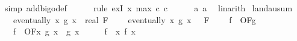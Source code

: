 \begin{isabellebody}
\ {\isacharparenleft}{\kern0pt}simp\ add{\isacharcolon}{\kern0pt}bigo{\isacharunderscore}{\kern0pt}def{\isacharparenright}{\kern0pt}\isanewline
\ \ \ \ \isamarkupfalse%
\ {\isacharparenleft}{\kern0pt}rule\ exI{\isacharbrackleft}{\kern0pt}\ x{\isacharequal}{\kern0pt}\ {\isachardoublequoteopen}max\ c{}\ c{}{\isachardoublequoteclose}{\isacharbrackright}{\kern0pt}{\isacharparenright}{\kern0pt}\isanewline
\ \ \ \ \isamarkupfalse%
\ a{}\ a{}\ \isamarkupfalse%
\ linarith\isanewline
{}\isamarkupfalse%
%
\endisatagproof
{\isafoldproof}%
%
\isadelimproof
\isanewline
%
\endisadelimproof
\isanewline
{}\isamarkupfalse%
\ landau{\isacharunderscore}{\kern0pt}sum{\isacharunderscore}{\kern0pt}{}{\isacharcolon}{\kern0pt}\isanewline
\ \ \ {\isachardoublequoteopen}eventually\ {\isacharparenleft}{\kern0pt}{\isasymlambda}x{\isachardot}{\kern0pt}\ g{}\ x\ {\isasymge}\ {\isacharparenleft}{\kern0pt}{}{\isacharcolon}{\kern0pt}{\isacharcolon}{\kern0pt}real{\isacharparenright}{\kern0pt}{\isacharparenright}{\kern0pt}\ F{\isacharprime}{\kern0pt}{\isachardoublequoteclose}\ \isanewline
\ \ \ {\isachardoublequoteopen}eventually\ {\isacharparenleft}{\kern0pt}{\isasymlambda}x{\isachardot}{\kern0pt}\ g{}\ x\ {\isasymge}\ {}{\isacharparenright}{\kern0pt}\ F{\isacharprime}{\kern0pt}{\isachardoublequoteclose}\ \isanewline
\ \ \ {\isachardoublequoteopen}f\ {\isasymin}\ O{\isacharbrackleft}{\kern0pt}F{\isacharprime}{\kern0pt}{\isacharbrackright}{\kern0pt}{\isacharparenleft}{\kern0pt}g{}{\isacharparenright}{\kern0pt}{\isachardoublequoteclose}\isanewline
\ \ \ {\isachardoublequoteopen}f\ {\isasymin}\ O{\isacharbrackleft}{\kern0pt}F{\isacharprime}{\kern0pt}{\isacharbrackright}{\kern0pt}{\isacharparenleft}{\kern0pt}{\isasymlambda}x{\isachardot}{\kern0pt}\ g{}\ x\ {\isacharplus}{\kern0pt}\ g{}\ x{\isacharparenright}{\kern0pt}{\isachardoublequoteclose}\isanewline
%
\isadelimproof
%
\endisadelimproof
%
\isatagproof
{}\isamarkupfalse%
\ {\isacharminus}{\kern0pt}\isanewline
\ \ \isamarkupfalse%
\ {\isachardoublequoteopen}f\ {\isacharequal}{\kern0pt}\ {\isacharparenleft}{\kern0pt}{\isasymlambda}x{\isachardot}{\kern0pt}\ f\ x\ {\isacharplus}{\kern0pt}\ {}{\isacharparenright}{\kern0pt}{\isachardoublequoteclose}\isanewline
\ \ \ \ \isamarkupfalse%

\end{isabellebody}

